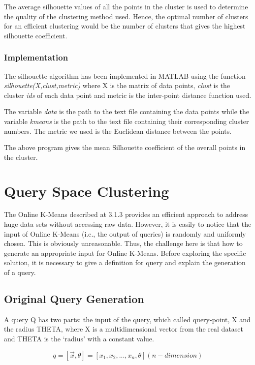 \documentclass{lmproj}
\begin{document}
The average silhouette values of all the points in the cluster is used to determine the quality of the clustering method used. Hence, the optimal number of clusters for an efficient clustering would be the number of clusters that gives the highest silhouette coefficient.
\subsubsection{Implementation}
The silhouette algorithm has been implemented in MATLAB using the function \textit{silhouette(X,clust,metric)} where X is the matrix of data points, \textit{clust} is the cluster \textit{ids} of each data point and metric is the inter-point distance function used. 

The variable \textit{data} is the path to the text file containing the data points while the variable \textit{kmeans} is the path to the text file containing their corresponding cluster numbers. The metric we used is the Euclidean distance between the points.


The above program gives the mean Silhouette coefficient of the overall points in the cluster.

\section{Query Space Clustering}

The Online K-Means described at 3.1.3 provides an efficient approach to address huge data sets without accessing raw data. However, it is easily to notice that the input of Online K-Means (i.e., the output of queries) is randomly and uniformly chosen. This is obviously unreasonable. Thus, the challenge here is that how to generate an appropriate input for Online K-Means. Before exploring the specific solution, it is necessary to give a definition for query and explain the generation of a query. 

\subsection{Original Query Generation}

A query Q has two parts: the input of the query, which called query-point, X and the radius THETA, where X is a multidimensional vector from the real dataset and THETA is the ‘radius’ with a constant value. 

\begin{equation}
	q =[\vec{x},\theta] =[x_1,x_2,...,x_n,\theta] (n-dimension)
\end{equation}
\end{document}
